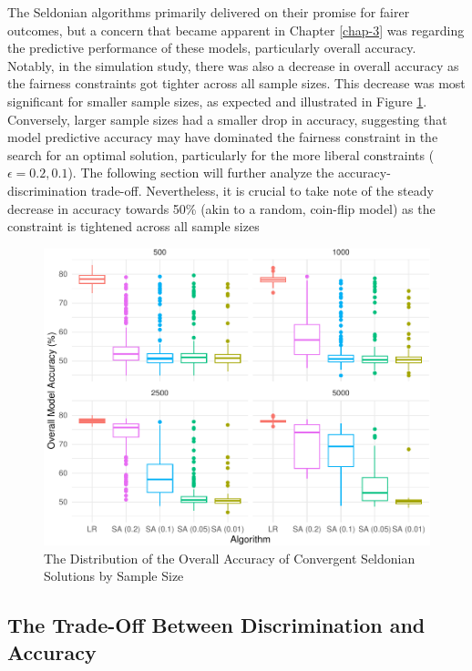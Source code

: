 \documentclass[12pt, twoside]{amherstthesis}
\begin{document}
The Seldonian algorithms primarily delivered on their promise for fairer outcomes, but a concern that became apparent in Chapter \ref{chap-3} was regarding the predictive performance of these models, particularly overall accuracy. Notably, in the simulation study, there was also a decrease in overall accuracy as the fairness constraints got tighter across all sample sizes. This decrease was most significant for smaller sample sizes, as expected and illustrated in Figure \ref{fig:ch4fig3}. Conversely, larger sample sizes had a smaller drop in accuracy, suggesting that model predictive accuracy may have dominated the fairness constraint in the search for an optimal solution, particularly for the more liberal constraints (\(\epsilon = 0.2, 0.1\)). The following section will further analyze the accuracy-discrimination trade-off. Nevertheless, it is crucial to take note of the steady decrease in accuracy towards 50\% (akin to a random, coin-flip model) as the constraint is tightened across all sample sizes
\begin{figure}

{\centering \includegraphics{Dasha-Asienga_StatThesis_files/figure-latex/ch4fig3-1} 

}

\caption{The Distribution of the Overall Accuracy of Convergent Seldonian Solutions by Sample Size}\label{fig:ch4fig3}
\end{figure}
\hypertarget{the-trade-off-between-discrimination-and-accuracy}{%
\subsection{The Trade-Off Between Discrimination and Accuracy}\label{the-trade-off-between-discrimination-and-accuracy}}
\end{document}
